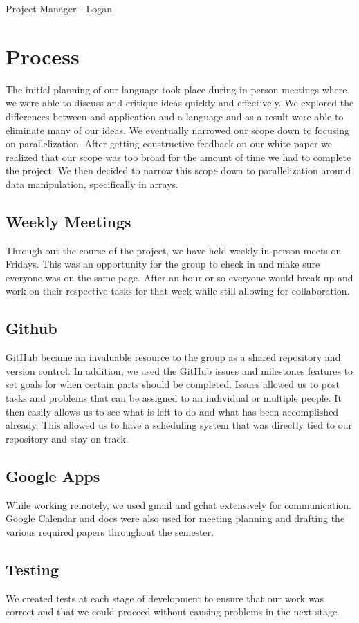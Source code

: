 Project Manager - Logan

\section{Process}
The initial planning of our language took place during in-person
meetings where we were able to discuss and critique ideas quickly and
effectively. We explored the differences between and application and a
language and as a result were able to eliminate many of our ideas. We
eventually narrowed our scope down to focusing on
parallelization. After getting constructive feedback on our white
paper we realized that our scope was too broad for the amount of time
we had to complete the project. We then decided to narrow this scope
down to parallelization around data manipulation, specifically in
arrays.
\subsection{Weekly Meetings}
Through out the course of the project, we have held weekly in-person
meets on Fridays. This was an opportunity for the group to check in
and make sure everyone was on the same page. After an hour or so
everyone would break up and work on their respective tasks for that
week while still allowing for collaboration.
\subsection{Github}
GitHub became an invaluable resource to the group as a shared
repository and version control. In addition, we used the GitHub issues
and milestones features to set goals for when certain parts should be
completed.  Issues allowed us to post tasks and problems that can be
assigned to an individual or multiple people. It then easily allows us
to see what is left to do and what has been accomplished already. This
allowed us to have a scheduling system that was directly tied to our
repository and stay on track.
\subsection{Google Apps}
While working remotely, we used gmail and gchat extensively for
communication. Google Calendar and docs were also used for meeting
planning and drafting the various required papers throughout the
semester.
\subsection{Testing}
We created tests at each stage of development to ensure that our work
was correct and that we could proceed without causing problems in the
next stage.

